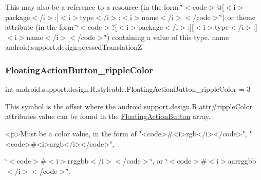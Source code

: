 This may also be a reference to a resource (in the form \char`\"{}$<$code$>$@\mbox{[}$<$i$>$package$<$/i$>$\+:\mbox{]}$<$i$>$type$<$/i$>$\+:$<$i$>$name$<$/i$>$$<$/code$>$\char`\"{}) or theme attribute (in the form \char`\"{}$<$code$>$?\mbox{[}$<$i$>$package$<$/i$>$\+:\mbox{]}\mbox{[}$<$i$>$type$<$/i$>$\+:\mbox{]}$<$i$>$name$<$/i$>$$<$/code$>$\char`\"{}) containing a value of this type.  name android.\+support.\+design\+:pressed\+TranslationZ \mbox{\label{classandroid_1_1support_1_1design_1_1R_1_1styleable_aca2b9d9c2c8a2eab5ffeaa66dd6a13cb}} 
\subsubsection{\texorpdfstring{Floating\+Action\+Button\+\_\+ripple\+Color}{FloatingActionButton\_rippleColor}}
{\footnotesize\ttfamily int android.\+support.\+design.\+R.\+styleable.\+Floating\+Action\+Button\+\_\+ripple\+Color = 3\hspace{0.3cm}{\ttfamily [static]}}

This symbol is the offset where the \hyperlink{classandroid_1_1support_1_1design_1_1R_1_1attr_a03164f9c470ccf03a4ce67c539f71698}{android.\+support.\+design.\+R.\+attr\#ripple\+Color} attribute\textquotesingle{}s value can be found in the \hyperlink{classandroid_1_1support_1_1design_1_1R_1_1styleable_ac39eabec239d50ec950ae5f013825830}{Floating\+Action\+Button} array.

\begin{DoxyVerb}      <p>Must be a color value, in the form of "<code>#<i>rgb</i></code>", "<code>#<i>argb</i></code>",
\end{DoxyVerb}
 \char`\"{}$<$code$>$\#$<$i$>$rrggbb$<$/i$>$$<$/code$>$\char`\"{}, or \char`\"{}$<$code$>$\#$<$i$>$aarrggbb$<$/i$>$$<$/code$>$\char`\"{}. 


